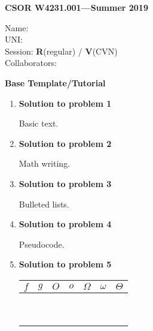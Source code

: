 \documentclass[11pt]{article}
\newcommand{\problemitem}[1]{
  \bigskip
  \item {\bf Solution to problem #1}
  \medskip
}
\begin{document}
\begin{flushright}
{\bf CSOR W4231.001---Summer 2019}
\end{flushright}
\begin{flushleft}
  Name: \\
  UNI: \\
  Session: {\bf R}(regular) / {\bf V}(CVN) \\ %
  Collaborators: \\ %
\end{flushleft}

\bigskip
\centerline{\bf Base Template/Tutorial}

\begin{enumerate}

\problemitem{1}

Basic text.

\problemitem{2}

Math writing.

\problemitem{3}

Bulleted lists.

\problemitem{4}

Pseudocode.

\problemitem{5}

\begin{table}[tbh]
  \centering
  \renewcommand\arraystretch{1.5}
  \begin{tabular}{|c|c|c|c|c|c|c|}\hline
  $f$ & $g$ & $O$ & $o$ & $\Omega$ & $\omega$  & $\Theta$  \\ \hline
      &     &     &     &          &           &           \\ \hline
      &     &     &     &          &           &           \\ \hline
      &     &     &     &          &           &           \\ \hline
      &     &     &     &          &           &           \\ \hline
      &     &     &     &          &           &           \\ \hline
      &     &     &     &          &           &           \\ \hline
      &     &     &     &          &           &           \\ \hline
      &     &     &     &          &           &           \\ \hline
      &     &     &     &          &           &           \\ \hline
  \end{tabular}
\end{table}

\end{enumerate}
\end{document}

